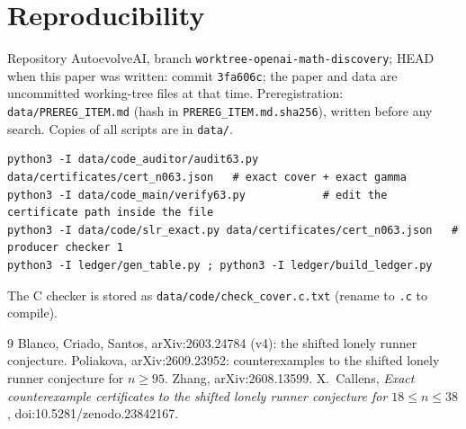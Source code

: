 \documentclass[10pt]{article}
\begin{document}
\section{Reproducibility}\label{sec:repro}
Repository AutoevolveAI, branch \texttt{worktree-openai-math-discovery}; HEAD when this paper was written: commit \texttt{3fa606c}; the paper and data are uncommitted working-tree files at that time. Preregistration: \texttt{data/PREREG\_ITEM.md} (hash in \texttt{PREREG\_ITEM.md.sha256}), written before any search. Copies of all scripts are in \texttt{data/}.
\begin{lstlisting}[basicstyle=\ttfamily\scriptsize]
python3 -I data/code_auditor/audit63.py data/certificates/cert_n063.json   # exact cover + exact gamma
python3 -I data/code_main/verify63.py            # edit the certificate path inside the file
python3 -I data/code/slr_exact.py data/certificates/cert_n063.json   # producer checker 1
python3 -I ledger/gen_table.py ; python3 -I ledger/build_ledger.py
\end{lstlisting}
The C checker is stored as \texttt{data/code/check\_cover.c.txt} (rename to \texttt{.c} to compile).

\begin{thebibliography}{9}\small
{} Blanco, Criado, Santos, arXiv:2603.24784 (v4): the shifted lonely runner conjecture.
 Poliakova, arXiv:2609.23952: counterexamples to the shifted lonely runner conjecture for $n\ge95$.
 Zhang, arXiv:2608.13599.
 X.~Callens, \emph{Exact counterexample certificates to the shifted lonely runner conjecture for $18\le n\le38$}, doi:10.5281/zenodo.23842167.
\end{thebibliography}
\end{document}
